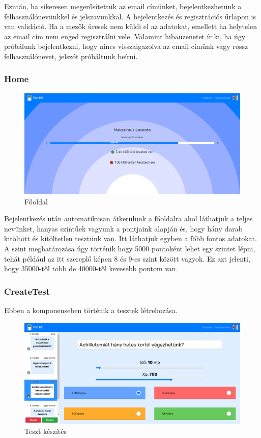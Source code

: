 Ezután, ha sikeresen megerősítettük az email címünket, bejelentkezhetünk  a felhasználónevünkkel és jelszavunkkal.
A bejelentkezés és regisztrációs űrlapon is van validáció. Ha a mezők üresek nem küldi el az adatokat, emellett ha helytelen az email cím nem enged regisztrálni vele. Valamint hibaüzenetet ír ki, ha úgy próbálunk bejelentkezni, hogy nincs visszaigazolva az email címünk vagy rossz felhasználónevet, jelszót próbáltunk beírni.

\subsubsection{Home}

\begin{figure}[H]
    \centering
    \includegraphics[width=\linewidth]{images/home.png}
    \caption{Főoldal}
    \label{fig:home}
\end{figure}

Bejelentkezés után automatikusan átkerülünk a főoldalra  ahol láthatjuk a teljes nevünket, hanyas szintűek vagyunk a pontjaink alapján és, hogy hány darab kitöltött és kitöltetlen tesztünk van. Itt láthatjuk egyben a főbb fontos adatokat. A szint meghatározása úgy történik hogy 5000 pontoként lehet egy szintet lépni, tehát például az itt szereplő képen 8 és 9-es szint között vagyok. Ez azt jelenti, hogy 35000-től több de 40000-től kevesebb pontom van.

\subsubsection{CreateTest}

Ebben a komponenseben történik a tesztek létrehozása.

\begin{figure}[H]
    \centering
    \includegraphics[width=\linewidth]{images/make_test1.png}
    \caption{Teszt készítés}
    \label{fig:make_test1}
\end{figure}

